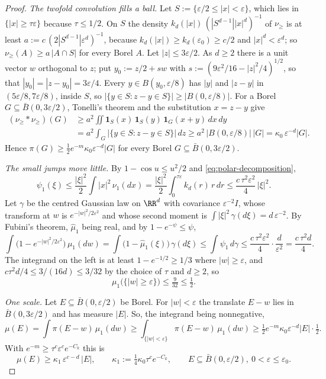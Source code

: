\begin{proof}
\emph{The twofold convolution fills a ball.} Let $S := \{\varepsilon/2 \le |x| < \varepsilon\}$, which
lies in $\{|x| \ge \tau\varepsilon\}$ because $\tau \le 1/2$. On $S$ the density
$k_d(|x|)\,(|S^{d-1}||x|^d)^{-1}$ of $\nu_{\ge}$ is at least
$a := c\,(2|S^{d-1}|\varepsilon^d)^{-1}$, because $k_d(|x|) \ge k_d(\varepsilon_0) \ge c/2$ and
$|x|^d < \varepsilon^d$; so $\nu_{\ge}(A) \ge a\,|A \cap S|$ for every Borel $A$. Let
$|z| \le 3\varepsilon/2$. As $d \ge 2$ there is a unit vector $w$ orthogonal to $z$; put
$y_0 := z/2 + sw$ with $s := (9\varepsilon^2/16 - |z|^2/4)^{1/2}$, so that
$|y_0| = |z - y_0| = 3\varepsilon/4$. Every $y \in B(y_0,\varepsilon/8)$ has $|y|$ and $|z - y|$ in
$(5\varepsilon/8, 7\varepsilon/8)$, inside $S$, so
$|\{y \in S : z - y \in S\}| \ge |B(0,\varepsilon/8)|$. For a Borel $G \subseteq \bar B(0,3\varepsilon/2)$,
Tonelli's theorem and the substitution $x = z - y$ give
\[
\begin{aligned}
  (\nu_{\ge} * \nu_{\ge})(G) &\ge a^2\iint\mathbf 1_S(x)\,\mathbf 1_S(y)\,\mathbf 1_G(x + y)\,dx\,dy \\
   &= a^2\int_G\bigl|\{y \in S : z - y \in S\}\bigr|\,dz
   \ge a^2\,\bigl|B(0,\varepsilon/8)\bigr|\,|G| = \kappa_0\,\varepsilon^{-d}|G| .
\end{aligned}
\]
Hence $\pi(G) \ge \tfrac12 e^{-m}\kappa_0\varepsilon^{-d}|G|$ for every Borel
$G \subseteq \bar B(0, 3\varepsilon/2)$.

\emph{The small jumps move little.} By $1 - \cos u \le u^2/2$ and \ref{eq:polar-decomposition},
\[
  \psi_1(\xi) \le \frac{|\xi|^2}{2}\int|x|^2\,\nu_1(dx)
   = \frac{|\xi|^2}{2}\int_0^{\tau\varepsilon}k_d(r)\,r\,dr
   \le \frac{c\,\tau^2\varepsilon^2}{4}\,|\xi|^2 .
\]
Let $\gamma$ be the centred Gaussian law on $\RR^d$ with covariance $\varepsilon^{-2}I$, whose
transform at $w$ is $e^{-|w|^2/2\varepsilon^2}$ and whose second moment is
$\int|\xi|^2\,\gamma(d\xi) = d\,\varepsilon^{-2}$. By Fubini's theorem, $\widehat\mu_1$ being real,
and by $1 - e^{-\psi} \le \psi$,
\[
  \int\bigl(1 - e^{-|w|^2/2\varepsilon^2}\bigr)\,\mu_1(dw)
   = \int\bigl(1 - \widehat\mu_1(\xi)\bigr)\,\gamma(d\xi)
   \le \int\psi_1\,d\gamma
   \le \frac{c\,\tau^2\varepsilon^2}{4}\cdot\frac{d}{\varepsilon^2} = \frac{c\,\tau^2 d}{4} .
\]
The integrand on the left is at least $1 - e^{-1/2} \ge 1/3$ where $|w| \ge \varepsilon$, and
$c\tau^2 d/4 \le 3/(16d) \le 3/32$ by the choice of $\tau$ and $d \ge 2$, so
\[
  \mu_1\bigl(\{|w| \ge \varepsilon\}\bigr) \le \tfrac{9}{32} \le \tfrac12 .
\]

\emph{One scale.} Let $E \subseteq \bar B(0,\varepsilon/2)$ be Borel. For $|w| < \varepsilon$ the
translate $E - w$ lies in $\bar B(0,3\varepsilon/2)$ and has measure $|E|$. So, the integrand being
nonnegative,
\[
  \mu(E) = \int\pi(E - w)\,\mu_1(dw)
   \ge \int_{\{|w|<\varepsilon\}}\pi(E - w)\,\mu_1(dw)
   \ge \tfrac12 e^{-m}\kappa_0\varepsilon^{-d}|E|\cdot\tfrac12 .
\]
With $e^{-m} \ge \tau^c\varepsilon^c e^{-C_k}$ this is
\[
  \mu(E) \ge \kappa_1\,\varepsilon^{c-d}\,|E| ,\qquad
  \kappa_1 := \tfrac14\kappa_0\tau^ce^{-C_k},\qquad
  E \subseteq \bar B(0,\varepsilon/2),\ 0 < \varepsilon \le \varepsilon_0 .
\]


\end{proof}
